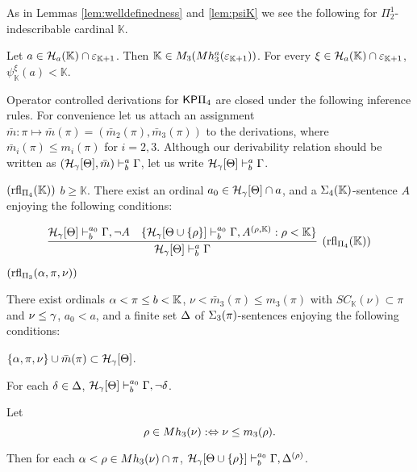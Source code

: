 \documentclass{article}
\newcommand{\mK}{\mathbb{K}}
\begin{document}
As in Lemmas \ref{lem:welldefinedness} and \ref{lem:psiK} we see the following
for $\Pi^{1}_{2}$-indescribable cardinal $\mK$.

\blem\label{lem:psiK3}
Let $a\in\calh_{a}(\mK)\cap\veps_{\mK+1}$. Then
$\mK\in M_{3}(Mh^{a}_{3}(\veps_{\mK+1}))$.
For every $\xi\in\calh_{a}(\mK)\cap\veps_{\mK+1}$,
$\psi_{\mK}^{\xi}(a)<\mK$.
\elem








Operator controlled derivations for ${\sf KP}\Pi_{4}$ are closed under the following inference rules.
For convenience let us attach an assignment 
$\bar{m}:\pi\mapsto\bar{m}(\pi)=(\bar{m}_{2}(\pi),\bar{m}_{3}(\pi))$ to the derivations,
where $\bar{m}_{i}(\pi)\leq m_{i}(\pi)$ for $i=2,3$.
Although our derivability relation should be written as
$({\cal H}_{\gamma}[\Theta],\bar{m})\vdash^{a}_{b}\Gamma$,
let us write ${\cal H}_{\gamma}[\Theta]\vdash^{a}_{b}\Gamma$.



\bdes
\item[$({\rm rfl}_{\Pi_{4}}(\mK))$]
$b\geq\mK$.
There exist 
an ordinal $a_{0}\in{\cal H}_{\gamma}[\Theta]\cap a$,
and a $\Sig_{4}(\mK)$-sentence $A$ enjoying the following conditions:

\[
\infer[({\rm rfl}_{\Pi_{4}}(\mK))]{
\calh_{\gam}[\Tht]\vdash^{a}_{b}\Gam}
{
\mathcal{H}_{\gam}[\Tht]\vdash^{a_{0}}_{b}\Gamma, \lnot A
&
\{
\mathcal{H}_{\gam}[\Tht\cup \{\rho\}]\vdash^{a_{0}}_{b}\Gamma, 
A^{(\rho,\mK)}: \rho<\mK\}
}
\]

\item[$({\rm rfl}_{\Pi_{3}}(\alpha,\pi,\nu))$]

There exist ordinals 
$\alp<\pi\leq b<\mK$, 
$\nu<\bar{m}_{3}(\pi)\leq m_{3}(\pi)$ with $SC_{\mK}(\nu)\subset\pi$ and $\nu\leq\gamma$, 
$a_{0}<a$,
and a finite set $\Delta$ of $\Sigma_{3}(\pi)$-sentences enjoying the following conditions:

\benu

\item 
$\{\alpha,\pi,\nu\}\cup\bar{m}(\pi)\subset{\cal H}_{\gamma}[\Theta]$. 


 \item
For each $\delta\in\Delta$,
$
\mathcal{H}_{\gamma}[\Theta]\vdash^{a_{0}}_{b}\Gamma, \lnot\delta
$.

\item

Let
\[
\rho\in Mh_{3}(\nu):\Leftrightarrow
\nu\leq m_{3}(\rho)
.\]


Then for each $\alpha<\rho\in Mh_{3}(\nu)\cap\pi$,
$\mathcal{H}_{\gamma}[\Theta\cup \{\rho\}]\vdash^{a_{0}}_{b}\Gamma, 
\Delta^{(\rho)}$.
\eenu
\end{document}
